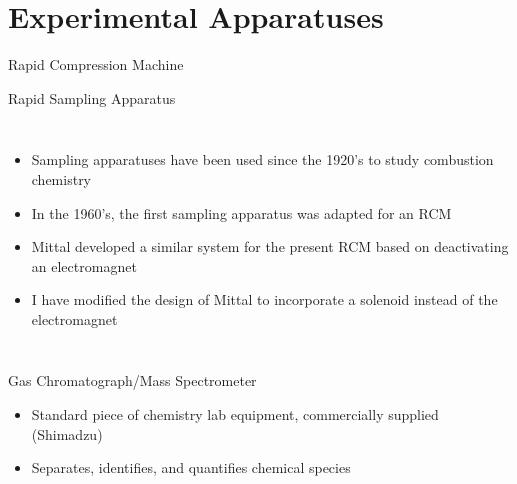 \documentclass{beamer}
\begin{document}
\section{Experimental Apparatuses}

\begin{frame}{Rapid Compression Machine}
\end{frame}

\begin{frame}{Rapid Sampling Apparatus}
    \begin{columns}
            \begin{itemize}
                \item<1-> Sampling apparatuses have been used since the 1920's to study combustion chemistry
                \item<2-> In the 1960's, the first sampling apparatus was adapted for an RCM
                \item<3-> Mittal developed a similar system for the present RCM based on deactivating an electromagnet
                \item<4-> I have modified the design of Mittal to incorporate a solenoid instead of the electromagnet
            \end{itemize}
            \begin{minipage}[c][8cm][c]{\textwidth}
            \end{minipage}
    \end{columns}
\end{frame}

\begin{frame}{Gas Chromatograph/Mass Spectrometer}
    \begin{itemize}
        \item Standard piece of chemistry lab equipment, commercially supplied (Shimadzu)
        \item Separates, identifies, and quantifies chemical species
    \end{itemize}
\end{frame}
\end{document}
